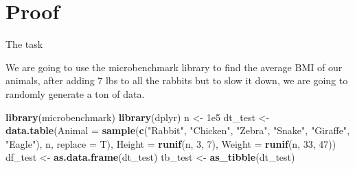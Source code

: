 \documentclass[ignorenonframetext,]{beamer}
\newenvironment{Shaded}{\begin{snugshade}}{\end{snugshade}}
\newcommand{\DataTypeTok}[1]{\textcolor[rgb]{0.13,0.29,0.53}{#1}}
\newcommand{\DecValTok}[1]{\textcolor[rgb]{0.00,0.00,0.81}{#1}}
\newcommand{\FloatTok}[1]{\textcolor[rgb]{0.00,0.00,0.81}{#1}}
\newcommand{\KeywordTok}[1]{\textcolor[rgb]{0.13,0.29,0.53}{\textbf{#1}}}
\newcommand{\NormalTok}[1]{#1}
\newcommand{\StringTok}[1]{\textcolor[rgb]{0.31,0.60,0.02}{#1}}
\begin{document}
\hypertarget{proof}{%
\section{Proof}\label{proof}}

\begin{frame}[fragile]{The task}
\protect\hypertarget{the-task}{}

We are going to use the microbenchmark library to find the average BMI
of our animals, after adding 7 lbs to all the rabbits but to slow it
down, we are going to randomly generate a ton of data.

\begin{Shaded}
\begin{Highlighting}[]
\KeywordTok{library}\NormalTok{(microbenchmark)}
\KeywordTok{library}\NormalTok{(dplyr)}
\NormalTok{n <-}\StringTok{ }\FloatTok{1e5}
\NormalTok{dt_test <-}
\StringTok{  }\KeywordTok{data.table}\NormalTok{(}\DataTypeTok{Animal =} \KeywordTok{sample}\NormalTok{(}\KeywordTok{c}\NormalTok{(}\StringTok{"Rabbit"}\NormalTok{, }\StringTok{"Chicken"}\NormalTok{,}
                               \StringTok{"Zebra"}\NormalTok{, }\StringTok{"Snake"}\NormalTok{,}
                               \StringTok{"Giraffe"}\NormalTok{, }\StringTok{"Eagle"}\NormalTok{),}
\NormalTok{                             n, }\DataTypeTok{replace =}\NormalTok{ T),}
             \DataTypeTok{Height =} \KeywordTok{runif}\NormalTok{(n, }\DecValTok{3}\NormalTok{, }\DecValTok{7}\NormalTok{),}
             \DataTypeTok{Weight =} \KeywordTok{runif}\NormalTok{(n, }\DecValTok{33}\NormalTok{, }\DecValTok{47}\NormalTok{))}
\NormalTok{df_test <-}\StringTok{ }\KeywordTok{as.data.frame}\NormalTok{(dt_test)}
\NormalTok{tb_test <-}\StringTok{ }\KeywordTok{as_tibble}\NormalTok{(dt_test)}
\end{Highlighting}
\end{Shaded}

\end{frame}
\end{document}
